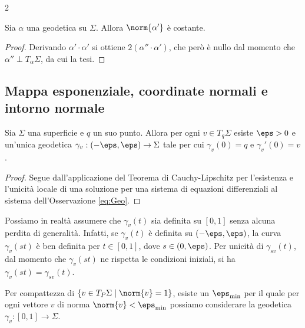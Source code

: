 \begin{multicols*}{2}
    \begin{proposition}
        Sia $\alpha$ una geodetica su $\Sigma$. Allora
        $\norm{\alpha'}$ è costante.
    \end{proposition}

    \begin{proof}
        Derivando $\alpha' \cdot \alpha'$ si ottiene
        $2 (\alpha'' \cdot \alpha')$, che però è nullo dal momento
        che $\alpha'' \perp T_{\alpha} \Sigma$, da cui la tesi.
    \end{proof}

    \subsection{Mappa esponenziale, coordinate normali e intorno normale}

    \begin{proposition}
        Sia $\Sigma$ una superficie e $q$ un suo punto. Allora per ogni $v \in T_q \Sigma$ esiste $\eps > 0$ e
        un'unica geodetica $\gamma_v : (-\eps, \eps) \to \Sigma$ tale per cui $\gamma_v(0) = q$ e
        $\gamma_v'(0) = v$.
    \end{proposition}

    \begin{proof}
        Segue dall'applicazione del Teorema di Cauchy-Lipschitz per l'esistenza e l'unicità locale di una
        soluzione per una sistema di equazioni differenziali al sistema dell'Osservazione \ref{eq:Geo}.
    \end{proof}

    \begin{remark}
        Possiamo in realtà assumere che $\gamma_v(t)$ sia definita su $[0, 1]$ senza alcuna perdita di generalità.
        Infatti, se $\gamma_v(t)$ è definita su $(-\eps, \eps)$, la curva
        $\gamma_v(st)$ è ben definita per $t \in [0, 1]$, dove $s \in (0, \eps)$. Per unicità di $\gamma_{sv}(t)$, dal momento che
        $\gamma_v(st)$ ne rispetta le condizioni iniziali, si ha $\gamma_v(st) = \gamma_{sv}(t)$. \smallskip
    \end{remark}

    \begin{remark} \label{rmk:geodetiche}
        Per compattezza di $\{v \in T_P \Sigma \mid \norm{v} = 1\}$, esiste un $\eps_{\textnormal{min}}$ per il
        quale per ogni vettore $v$ di norma $\norm{v} < \eps_{\textnormal{min}}$ possiamo considerare la geodetica
        $\gamma_v : [0, 1] \to \Sigma$. \smallskip


\end{remark}
\end{multicols*}

